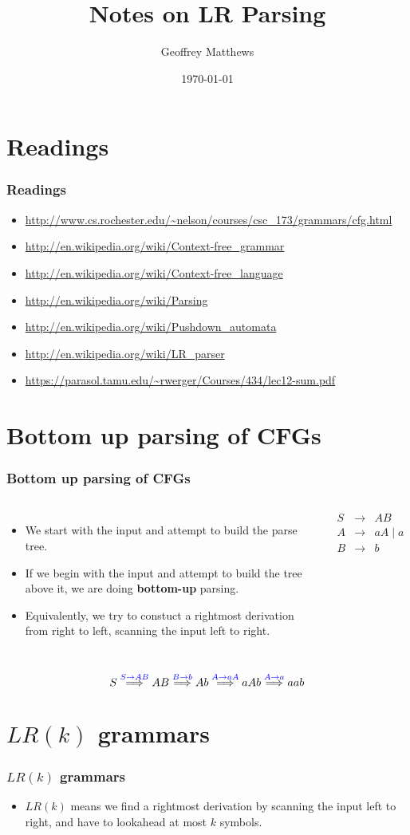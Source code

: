 \documentclass{beamer}
\title[Notes on LR Parsing]
{
 Notes on LR  Parsing
}
\subtitle{} %
\author[Geoffrey Matthews]
{Geoffrey Matthews}
\institute[WWU/CS]
{
  Department of Computer Science\\
  Western Washington University
}
\date{\today}
\newcommand{\sect}[1]{
\section{#1}
\begin{frame}[fragile]\frametitle{#1}
}
\newcommand{\arr}{&\rightarrow&}
\newcommand{\ar}{\ensuremath{\rightarrow}}
\newcommand{\bee}{\begin{eqnarray*}}
\newcommand{\eee}{\end{eqnarray*}}
\newcommand{\deriv}[1]{\ensuremath{\stackrel{{\color{blue} #1}}{\Longrightarrow}}}
\newcommand{\bi}{\begin{itemize}}
\newcommand{\li}{\item}
\newcommand{\ei}{\end{itemize}}
\begin{document}
\begin{frame}
  \titlepage
\end{frame}


\newcommand{\myref}[1]{\small\item\url{#1}}
\newcommand{\myreft}[1]{\footnotesize\item\url{#1}}


\sect{Readings}

\begin{itemize}

\myreft{http://www.cs.rochester.edu/~nelson/courses/csc_173/grammars/cfg.html}

\myreft{http://en.wikipedia.org/wiki/Context-free_grammar}

\myreft{http://en.wikipedia.org/wiki/Context-free_language}
\myreft{http://en.wikipedia.org/wiki/Parsing}

\myreft{http://en.wikipedia.org/wiki/Pushdown_automata}
\myreft{http://en.wikipedia.org/wiki/LR_parser}
\myreft{https://parasol.tamu.edu/~rwerger/Courses/434/lec12-sum.pdf}
\end{itemize}

\end{frame}

\sect{Bottom up parsing of CFGs}
\begin{columns}
\bi
\li We start with the input and attempt to build the parse tree.
\li If we begin with the input and attempt to build the tree 
above it, we are doing {\bf bottom-up} parsing.
\li Equivalently, we try to constuct a rightmost derivation from right
to left, scanning the input left to right.
\ei
{}
\bee
S \arr AB\\
A \arr aA \mid a\\
B \arr b
\eee
{}
\end{columns}
\vfill
\[
S \deriv{S\ar AB} AB
  \deriv{B \ar b} Ab
  \deriv{A \ar aA} aAb
  \deriv{A \ar a} aab
\]
\end{frame}


\sect{$LR(k)$ grammars}
\bi
\li $LR(k)$ means we find a rightmost derivation by scanning the input
left to right, and have to lookahead at most $k$ symbols.
\ei
\end{frame}
\end{document}
